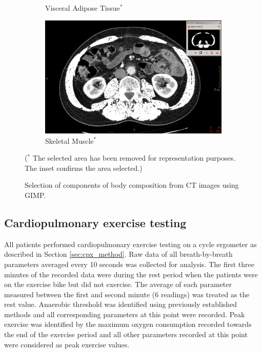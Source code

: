 \begin{figure}[htbp]
\begin{subfigure}{0.45\textwidth}
		\caption{Visceral Adipose Tissue$^*$}
		\label{fig:bc_ct_vat}
	\end{subfigure}
	\begin{subfigure}{0.45\textwidth}
		\centering
		\includegraphics[width=\textwidth]{Figures/bc_ct_sm}
		\caption{Skeletal Muscle$^*$}
		\label{fig:bc_ct_sm}
	\end{subfigure}
	
	\caption{Selection of components of body composition from CT images using GIMP.}($^*$ The selected area has been removed for representation purposes. 
The inset confirms the area selected.)
	\label{fig:bc_ct_gimp}
	
\end{figure}

\subsection{Cardiopulmonary exercise testing}
All patients performed cardiopulmonary exercise testing on a cycle ergometer as described in Section \ref{sec:cpx_method}. 
Raw data of all breath-by-breath parameters averaged every 10 seconds was collected for analysis. 
The first three minutes of the recorded data were during the rest period when the patients were on the exercise bike but did not exercise. 
The average of each parameter measured between the first and second minute (6 readings) was treated as the rest value. 
Anaerobic threshold was identified using previously established methods \parencite{beaver_new_1986,sue_metabolic_1988} and all corresponding parameters at this point were recorded. 
Peak exercise was identified by the maximum oxygen consumption recorded towards the end of the exercise period and all other parameters recorded at this point were considered as peak exercise values.

